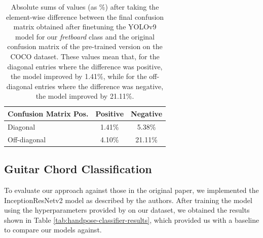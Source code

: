 \documentclass[10pt,twocolumn,letterpaper]{article}
\begin{document}
\begin{table}[h]
    \centering
    \begin{tabular}{lcc}
        \toprule
        \textbf{Confusion Matrix Pos.} & \textbf{Positive} & \textbf{Negative} \\
        \midrule
        Diagonal                       & 1.41\%            & 5.38\%            \\
        \midrule
        Off-diagonal                   & 4.10\%            & 21.11\%           \\
        \bottomrule
    \end{tabular}
    \caption{Absolute sums of values (as \%) after taking the element-wise difference between the final confusion matrix obtained after finetuning the YOLOv9 model for our \emph{fretboard} class and the original confusion matrix of the pre-trained version on the COCO dataset. These values mean that, for the diagonal entries where the difference was positive, the model improved by 1.41\%, while for the off-diagonal entries where the difference was negative, the model improved by 21.11\%.}
    \label{tab:confusion-matrix-results}
\end{table}



\subsection{Guitar Chord Classification}
To evaluate our approach against those in the original paper, we implemented the InceptionResNetv2 model as described by the authors. After training the model using the hyperparameters provided by \cite{Kristian_Zaman_Tenoyo_Jodhinata_2024} on our dataset, we obtained the results shown in Table \ref{tab:handpose-classifier-results}, which provided us with a baseline to compare our models against.
\end{document}
